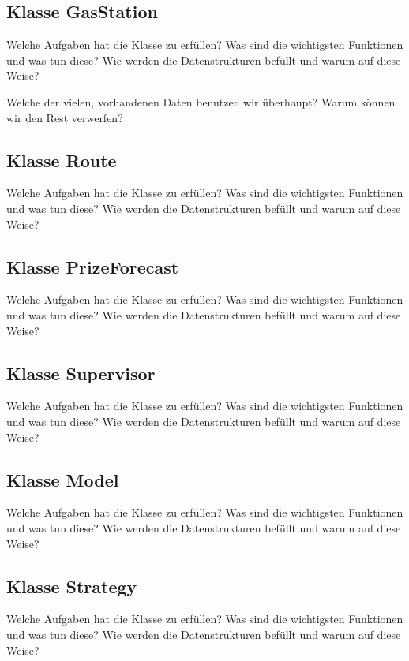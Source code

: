 \documentclass[11pt]{article}
\begin{document}
\subsection{Klasse GasStation}
	Welche Aufgaben hat die Klasse zu erfüllen? Was sind die wichtigsten Funktionen und was tun diese? Wie werden die Datenstrukturen befüllt und warum auf diese Weise?

	Welche der vielen, vorhandenen Daten benutzen wir überhaupt? Warum können wir den Rest verwerfen?
\subsection{Klasse Route}
	Welche Aufgaben hat die Klasse zu erfüllen? Was sind die wichtigsten Funktionen und was tun diese? Wie werden die Datenstrukturen befüllt und warum auf diese Weise?
\subsection{Klasse PrizeForecast}
	Welche Aufgaben hat die Klasse zu erfüllen? Was sind die wichtigsten Funktionen und was tun diese? Wie werden die Datenstrukturen befüllt und warum auf diese Weise?
\subsection{Klasse Supervisor}
	Welche Aufgaben hat die Klasse zu erfüllen? Was sind die wichtigsten Funktionen und was tun diese? Wie werden die Datenstrukturen befüllt und warum auf diese Weise?
\subsection{Klasse Model}
	Welche Aufgaben hat die Klasse zu erfüllen? Was sind die wichtigsten Funktionen und was tun diese? Wie werden die Datenstrukturen befüllt und warum auf diese Weise?
\subsection{Klasse Strategy}
	Welche Aufgaben hat die Klasse zu erfüllen? Was sind die wichtigsten Funktionen und was tun diese? Wie werden die Datenstrukturen befüllt und warum auf diese Weise?
\end{document}
